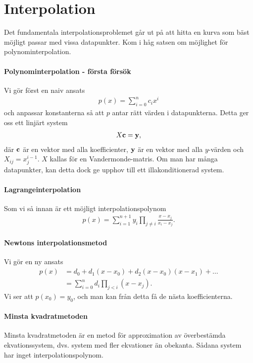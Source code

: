 \section{Interpolation}

Det fundamentala interpolationsproblemet går ut på att hitta en kurva som bäst möjligt passar med vissa datapunkter. Kom i håg satsen om möjlighet för polynominterpolation.

\paragraph{Polynominterpolation - första försök}
Vi gör först en naiv ansats
\begin{align*}
	p(x) = \sum\limits_{i = 0}^{n}c_{i}x^{i}
\end{align*}
och anpassar konstanterna så att $p$ antar rätt värden i datapunkterna. Detta ger oss ett linjärt system
\begin{align*}
	X\vb{c} = \vb{y},
\end{align*}
där $\vb{c}$ är en vektor med alla koefficienter, $\vb{y}$ är en vektor med alla $y$-värden och $X_{ij} = x_{j}^{i - 1}$. $X$ kallas för en Vandermonde-matris. Om man har många datapunkter, kan detta dock ge upphov till ett illakonditionerad system.

\paragraph{Lagrangeinterpolation}
Som vi så innan är ett möjligt interpolationspolynom
\begin{align*}
	p(x) = \sum\limits_{i = 1}^{n + 1}y_{i}\prod\limits_{j\neq i}\frac{x - x_{j}}{x_{i} - x_{j}}.
\end{align*}

\paragraph{Newtons interpolationsmetod}
Vi gör en ny ansats
\begin{align*}
	p(x) &= d_{0} + d_{1}(x - x_{0}) + d_{2}(x - x_{0})(x - x_{1}) + \dots \\
	     &= \sum\limits_{i = 0}^{n}d_{i}\prod\limits_{j < i}(x - x_{j}).
\end{align*}
Vi ser att $p(x_{0}) = y_{0}$, och man kan från detta få de nästa koefficienterna.

\paragraph{Minsta kvadratmetoden}
Minsta kvadratmetoden är en metod för approximation av överbestämda ekvationssystem, dvs. system med fler ekvationer än obekanta. Sådana system har inget interpolationspolynom.

